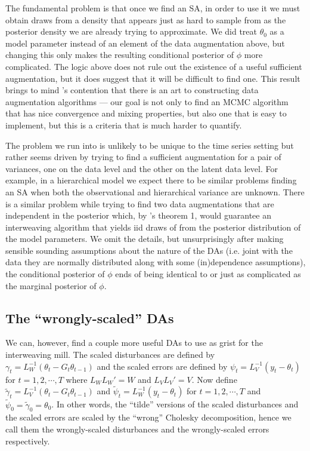 \documentclass{article}
\begin{document}
The fundamental problem is that once we find an SA, in order to use it we must obtain draws from a density that appears just as hard to sample from as the posterior density we are already trying to approximate. We did treat $\theta_0$ as a model parameter instead of an element of the data augmentation above, but changing this only makes the resulting conditional posterior of $\phi$ more complicated. The logic above does not rule out the existence of a useful sufficient augmentation, but it does suggest that it will be difficult to find one. This result brings to mind \citet{van2001art}'s contention that there is an art to constructing data augmentation algorithms --- our goal is not only to find an MCMC algorithm that has nice convergence and mixing properties, but also one that is easy to implement, but this is a criteria that is much harder to quantify.

The problem we run into is unlikely to be unique to the time series setting but rather seems driven by trying to find a sufficient augmentation for a pair of variances, one on the data level and the other on the latent data level. For example, in a hierarchical model we expect there to be similar problems finding an SA when both the observational and hierarchical variance are unknown. There is a similar problem while trying to find two data augmentations that are independent in the posterior which, by \citet{yu2011center}'s theorem 1, would guarantee an interweaving algorithm that yields iid draws of from the posterior distribution of the model parameters. We omit the details, but unsurprisingly after making sensible sounding assumptions about the nature of the DAs (i.e. joint with the data they are normally distributed along with some (in)dependence assumptions), the conditional posterior of $\phi$ ends of being identical to or just as complicated as the marginal posterior of $\phi$.

\subsection{The ``wrongly-scaled'' DAs}
We can, however, find a couple more useful DAs to use as grist for the interweaving mill. The scaled disturbances are defined by $\gamma_t = L_W^{-1}(\theta_t - G_t\theta_{t-1})$  and the scaled errors are defined by $\psi_t = L_V^{-1}(y_t - \theta_t)$ for $t=1,2,\cdots,T$ where $L_WL_W' = W$ and $L_VL_V' = V$. Now define $\tilde{\gamma}_t=L_V^{-1}(\theta_t - G_t\theta_{t-1})$ and $\tilde{\psi}_t=L_W^{-1}(y_t - \theta_t)$ for $t=1,2,\cdots,T$ and $\tilde{\psi}_0=\tilde{\gamma}_0=\theta_0$. In other words, the ``tilde'' versions of the scaled disturbances and the scaled errors are scaled by the ``wrong'' Cholesky decomposition, hence we call them the wrongly-scaled disturbances and the wrongly-scaled errors respectively. 
\end{document}
